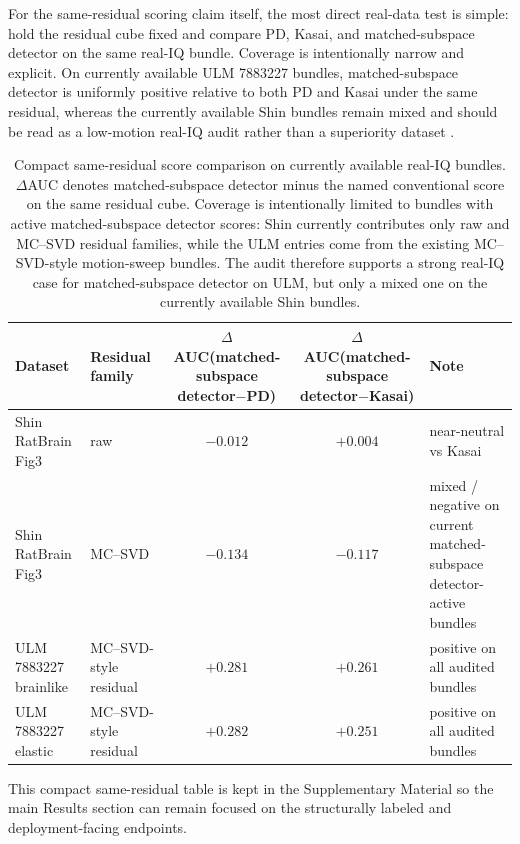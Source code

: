 For the same-residual scoring claim itself, the most direct real-data test is simple: hold the residual cube fixed and compare PD, Kasai, and matched-subspace detector on the same real-IQ bundle. Coverage is intentionally narrow and explicit. On currently available ULM 7883227 bundles, matched-subspace detector is uniformly positive relative to both PD and Kasai under the same residual, whereas the currently available Shin bundles remain mixed and should be read as a low-motion real-IQ audit rather than a superiority dataset \cite{ChavignonZenodo7883227,HeilesULMBenchmark2021,ShinLOCAULM2024,ShinZenodo10711806}.
\ifSUPPLEMENTONLY
\begin{table}[t]
\centering
\small
\begin{tabular}{l l c c l}
\hline
Dataset & Residual family & $\Delta$AUC(matched-subspace detector$-$PD) & $\Delta$AUC(matched-subspace detector$-$Kasai) & Note \\
\hline
Shin RatBrain Fig3 & raw & $-0.012$ & $+0.004$ & near-neutral vs Kasai \\
Shin RatBrain Fig3 & MC--SVD & $-0.134$ & $-0.117$ & mixed / negative on current matched-subspace detector-active bundles \\
ULM 7883227 brainlike & MC--SVD-style residual & $+0.281$ & $+0.261$ & positive on all audited bundles \\
ULM 7883227 elastic & MC--SVD-style residual & $+0.282$ & $+0.251$ & positive on all audited bundles \\
\hline
\end{tabular}
\caption{Compact same-residual score comparison on currently available real-IQ bundles. $\Delta$AUC denotes matched-subspace detector minus the named conventional score on the same residual cube. Coverage is intentionally limited to bundles with active matched-subspace detector scores: Shin currently contributes only raw and MC--SVD residual families, while the ULM entries come from the existing MC--SVD-style motion-sweep bundles. The audit therefore supports a strong real-IQ case for matched-subspace detector on ULM, but only a mixed one on the currently available Shin bundles.}
\label{tab:realdata_detector_head_audit}
\end{table}
\else
\noindent This compact same-residual table is kept in the Supplementary Material so the main Results section can remain focused on the structurally labeled and deployment-facing endpoints.
\fi

